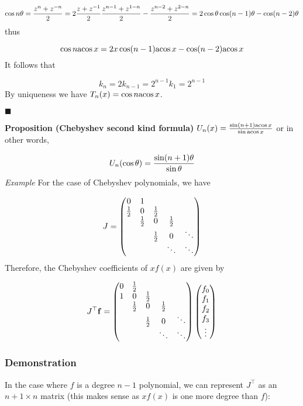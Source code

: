 \documentclass[12pt,a4paper]{article}
\def\half{ {1 \over 2} }
\def\vc#1{ {\mathbf #1} }
\def\acos{ {\rm acos}\, }
\begin{document}
\[
\cos n \theta = {z^n + z^{-n} \over 2} = 2 {z + z^{-1} \over 2} {z^{n-1} + z^{1-n} \over 2}- {z^{n-2} + z^{2-n} \over 2} =
2 \cos \theta \cos (n-1)\theta - \cos(n-2)\theta
\]
thus

\[
\cos n \acos x = 2 x \cos(n-1) \acos x - \cos(n-2) \acos x
\]
It follows that

\[
k_n = 2  k_{n-1} = 2^{n-1} k_1 = 2^{n-1}
\]
By uniqueness we have $T_n(x) = \cos n \acos x$.

\ensuremath{\blacksquare}

\textbf{Proposition (Chebyshev second kind formula)} $U_n(x) = {\sin (n+1) \acos x \over \sin \acos x}$ or in other words,

\[
U_n(\cos \theta) = {\sin (n+1) \theta \over \sin \theta}
\]
\emph{Example} For the case of Chebyshev polynomials, we have

\[
J = \begin{pmatrix}
0 & 1 \cr
\half & 0 & \half \cr
& \half & 0 & \half \cr
&& \half & 0 & \ddots \cr
&&&\ddots & \ddots
\end{pmatrix}
\]
Therefore, the Chebyshev coefficients of $x f(x)$ are given by

\[
J^\top \vc f = \begin{pmatrix}
0 & \half \cr
1 & 0 & \half \cr
& \half & 0 & \half \cr
&& \half & 0 & \ddots \cr
&&&\ddots & \ddots
\end{pmatrix} \begin{pmatrix} f_0\\ f_1\\f_2\\f_3\\\vdots\end{pmatrix}
\]
\subsubsection{Demonstration}
In the case where $f$ is a degree $n-1$  polynomial, we can represent $J^\top$ as an $n+1 \times n$ matrix (this makes sense as $x f(x)$ is one more degree than $f$):
\end{document}
